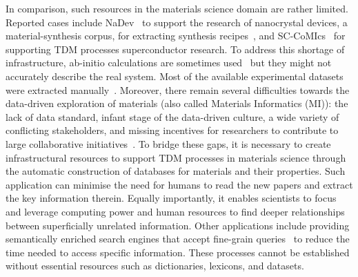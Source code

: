 \documentclass[fleqn,10pt]{wlscirep}
\begin{document}
In comparison, such resources in the materials science domain are rather limited. Reported cases include NaDev~\cite{Dieb2016} to support the research of nanocrystal devices,  a material-synthesis corpus, for extracting synthesis recipes~\cite{kononova_text-mined_2019}, and SC-CoMIcs~\cite{yamaguchi-etal-2020-sc} for supporting TDM processes superconductor research.
To address this shortage of infrastructure, ab-initio calculations are sometimes used~\cite{Jain2013CommentaryTM_materialsProject} but they might not accurately describe the real system. Most of the available experimental datasets were extracted manually~\cite{doi:10.1021/cm400893e}. 
Moreover, there remain several difficulties towards the data-driven exploration of materials (also called Materials Informatics (MI)): the lack of data standard, infant stage of the data-driven culture, a wide variety of conflicting stakeholders, and missing incentives for researchers to contribute to large collaborative initiatives~\cite{Hill2016MaterialsSW}. 
To bridge these gaps, it is necessary to create infrastructural resources to support TDM processes in materials science through the automatic construction of databases for materials and their properties. 
Such application can minimise the need for humans to read the new papers and extract the key information therein. 
Equally importantly, it enables scientists to focus and leverage computing power and human resources to find deeper relationships between superficially unrelated information. 
Other applications include providing semantically enriched search engines that accept fine-grain queries~\cite{Liu2019SurfaceMR} to reduce the time needed to access specific information. 
These processes cannot be established without essential resources such as dictionaries, lexicons, and datasets. 
\end{document}
